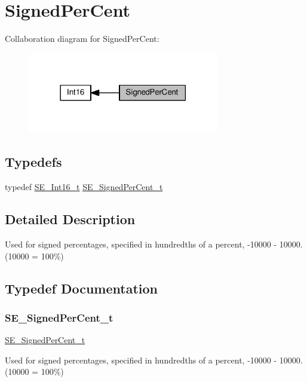 \hypertarget{group__SignedPerCent}{}\section{Signed\+Per\+Cent}
\label{group__SignedPerCent}
Collaboration diagram for Signed\+Per\+Cent\+:\nopagebreak
\begin{figure}[H]
\begin{center}
\leavevmode
\includegraphics[width=237pt]{group__SignedPerCent}
\end{center}
\end{figure}
\subsection*{Typedefs}
\begin{DoxyCompactItemize}
\item 
typedef \hyperlink{group__Int16_ga0d600c7df811a7d4b4816e8965877690}{S\+E\+\_\+\+Int16\+\_\+t} \hyperlink{group__SignedPerCent_ga3a844f23440f7c1756032f6ef2359fdf}{S\+E\+\_\+\+Signed\+Per\+Cent\+\_\+t}
\end{DoxyCompactItemize}


\subsection{Detailed Description}
Used for signed percentages, specified in hundredths of a percent, -\/10000 -\/ 10000. (10000 = 100\%) 

\subsection{Typedef Documentation}
\mbox{\label{group__SignedPerCent_ga3a844f23440f7c1756032f6ef2359fdf}} 
\subsubsection{\texorpdfstring{S\+E\+\_\+\+Signed\+Per\+Cent\+\_\+t}{SE\_SignedPerCent\_t}}
{\footnotesize\ttfamily \hyperlink{group__SignedPerCent_ga3a844f23440f7c1756032f6ef2359fdf}{S\+E\+\_\+\+Signed\+Per\+Cent\+\_\+t}}

Used for signed percentages, specified in hundredths of a percent, -\/10000 -\/ 10000. (10000 = 100\%) 